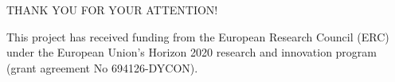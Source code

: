 \documentclass[xcolor=dvipsnames,10pt,hyperref={breaklinks=true}]{beamer}
\begin{document}
\begin{frame}
\begin{large}
	\begin{center}
		\color{lapislazuli}\selectfont THANK YOU FOR YOUR ATTENTION!\color{black}
	\end{center}
\end{large}

\begin{tcolorbox}[width=\textwidth,colframe=darklavender,colback=white]    
	\small{This project has received funding from the European Research Council (ERC) under the European Union’s Horizon 2020 research and innovation program (grant agreement No 694126-DYCON).}
\end{tcolorbox} 
% 
\end{frame}
\end{document}
